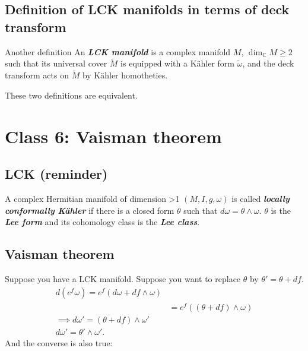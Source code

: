 \subsection{Definition of LCK manifolds in terms of deck transform}

\begin{thing6}{Another definition}\leavevmode
An \textit{\textbf{LCK manifold}} is a complex manifold \(M\), \(\dim_\mathbb{C} M \geq 2\) such that its universal cover \(\tilde{M}\) is equipped with a Kähler form \(\tilde{\omega}\), and the deck transform acts on \(\tilde{M}\) by Kähler homotheties.
\end{thing6}

\begin{thm}\leavevmode
	These two definitions are equivalent.
\end{thm}

\section{Class 6: Vaisman theorem}

\subsection{LCK (reminder)}

\begin{defn}\leavevmode
A complex Hermitian manifold of dimension >1 \((M,I,g,\omega)\) is called \textit{\textbf{locally conformally Kähler}} if there is a closed form \(\theta\) such that \(d \omega =\theta \wedge \omega\). \(\theta\) is the \textit{\textbf{Lee form}} and its cohomology class is the \textit{\textbf{Lee class}}.
\end{defn}

\subsection{Vaisman theorem}

Suppose you have a LCK manifold. Suppose you want to replace \(\theta\) by \(\theta'=\theta + df\).
\begin{align*}
d(e^f \omega )= e^f( d \omega +df \wedge \omega)\\
&=e^f((\theta + df) \wedge \omega)\\
\implies  d \omega'=(\theta+ df) \wedge \omega'\\
d \omega'=\theta' \wedge \omega'.
\end{align*}
And the converse is also true:


